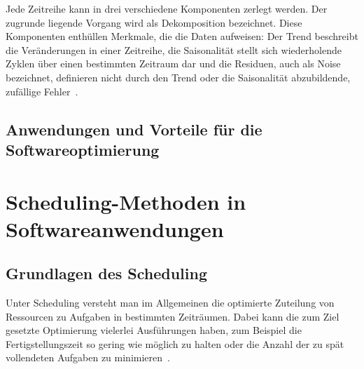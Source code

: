 Jede Zeitreihe kann in drei verschiedene Komponenten zerlegt werden.
Der zugrunde liegende Vorgang wird als Dekomposition bezeichnet.
Diese Komponenten enthüllen Merkmale, die die Daten aufweisen:
Der Trend beschreibt die Veränderungen in einer Zeitreihe, die Saisonalität stellt sich wiederholende Zyklen über einen bestimmten Zeitraum dar und die Residuen, auch als Noise bezeichnet, definieren nicht durch den Trend oder die Saisonalität abzubildende, zufällige Fehler~\cite{Peixeiro.2022}.

\subsection{Anwendungen und Vorteile für die Softwareoptimierung}

\section{Scheduling-Methoden in Softwareanwendungen}
\subsection{Grundlagen des Scheduling}
Unter Scheduling versteht man im Allgemeinen die optimierte Zuteilung von Ressourcen zu Aufgaben in bestimmten Zeiträumen.
Dabei kann die zum Ziel gesetzte Optimierung vielerlei Ausführungen haben, zum Beispiel die Fertigstellungszeit so gering wie möglich zu halten oder die Anzahl der zu spät vollendeten Aufgaben zu minimieren~\cite{Gawiejnowicz.2020}.


